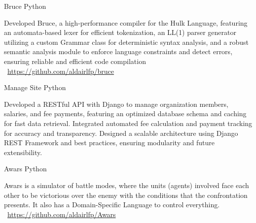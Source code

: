 \documentclass[]{awesome-cv}
\begin{document}
\begin{cventries}
	\vspace{-3mm}
	\cventry
	{}
	{Bruce \vspace{-5mm}}
	{Python \vspace{-5mm}}
	{}
	{\begin{cvsectionnormaltext}
			\item {Developed Bruce, a high-performance compiler for the Hulk Language, featuring an automata-based lexer for efficient
			            tokenization, an LL(1) parser generator utilizing a custom Grammar class for deterministic syntax analysis, and a robust
			            semantic analysis module to enforce language constraints and detect errors, ensuring reliable and efficient code
			            compilation
			            \newline \faLink\ \href{https://github.com/aldairlfp/bruce}{https://github.com/aldairlfp/bruce}}
		\end{cvsectionnormaltext}}

	\vspace{-3mm}
	\cventry
	{}
	{Manage Site \vspace{-5mm}}
	{Python \vspace{-5mm}}
	{}
	{\begin{cvsectionnormaltext}
			\item{Developed a RESTful API with Django to manage organization members, salaries, and fee payments, featuring an
			            optimized database schema and caching for fast data retrieval. Integrated automated fee calculation and payment
			            tracking for accuracy and transparency. Designed a scalable architecture using Django REST Framework and best practices, ensuring modularity and future extensibility.}
		\end{cvsectionnormaltext}}

	\vspace{-3mm}
	\cventry
	{}
	{Awars \vspace{-5mm}}
	{Python \vspace{-5mm}}
	{}
	{\begin{cvsectionnormaltext}
			\item{Awars is a simulator of battle modes, where the units (agents) involved face each other to be victorious over the enemy
with the conditions that the confrontation presents. It also has a Domain-Specific Language to control everything.
			            \newline \faLink\ \href{https://github.com/aldairlfp/Awars}{https://github.com/aldairlfp/Awars}}
		\end{cvsectionnormaltext}}


\end{cventries}
\end{document}
